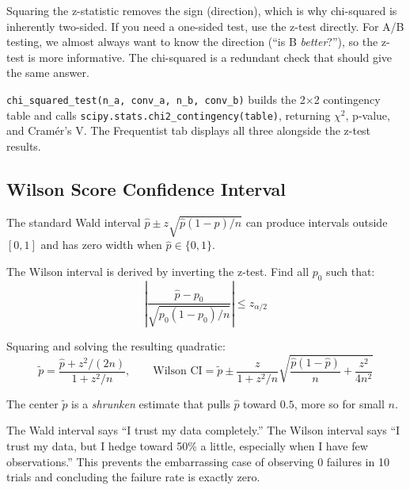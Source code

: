 \documentclass[11pt,a4paper]{article}
\newcommand{\code}[1]{\texttt{#1}}
\newcommand{\scipy}[1]{\texttt{scipy.stats.#1}}
\begin{document}
\vspace{8pt}

\begin{intuition}
Squaring the z-statistic removes the sign (direction), which is why chi-squared is inherently two-sided. If you need a one-sided test, use the z-test directly. For A/B testing, we almost always want to know the direction (``is B \emph{better}?''), so the z-test is more informative. The chi-squared is a redundant check that should give the same answer.
\end{intuition}

\vspace{8pt}

\begin{application}
\code{chi\_squared\_test(n\_a, conv\_a, n\_b, conv\_b)} builds the 2$\times$2 contingency table and calls \scipy{chi2\_contingency(table)}, returning $\chi^2$, p-value, and Cram\'{e}r's V. The Frequentist tab displays all three alongside the z-test results.
\end{application}

\subsection{Wilson Score Confidence Interval}

\begin{formaldef}
The standard Wald interval $\hat{p} \pm z\sqrt{\hat{p}(1-\hat{p})/n}$ can produce intervals outside $[0,1]$ and has zero width when $\hat{p} \in \{0, 1\}$.

The Wilson interval is derived by inverting the z-test. Find all $p_0$ such that:
\[
\left|\frac{\hat{p} - p_0}{\sqrt{p_0(1-p_0)/n}}\right| \leq z_{\alpha/2}
\]

Squaring and solving the resulting quadratic:
\[
\tilde{p} = \frac{\hat{p} + z^2/(2n)}{1 + z^2/n}, \qquad \text{Wilson CI} = \tilde{p} \pm \frac{z}{1 + z^2/n}\sqrt{\frac{\hat{p}(1-\hat{p})}{n} + \frac{z^2}{4n^2}}
\]

The center $\tilde{p}$ is a \emph{shrunken} estimate that pulls $\hat{p}$ toward $0.5$, more so for small $n$.
\end{formaldef}

\vspace{8pt}

\begin{intuition}
The Wald interval says ``I trust my data completely.'' The Wilson interval says ``I trust my data, but I hedge toward 50\% a little, especially when I have few observations.'' This prevents the embarrassing case of observing 0 failures in 10 trials and concluding the failure rate is exactly zero.
\end{intuition}
\end{document}
